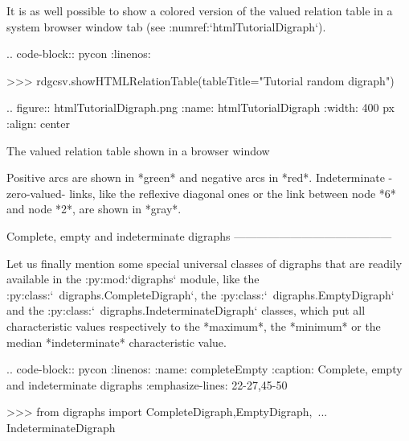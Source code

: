 {It is as well possible to show a colored version of the valued relation table in a system browser window tab (see :numref:`htmlTutorialDigraph`).

.. code-block:: pycon
   :linenos:

   >>> rdgcsv.showHTMLRelationTable(tableTitle="Tutorial random digraph")

.. figure:: htmlTutorialDigraph.png
   :name: htmlTutorialDigraph
   :width: 400 px
   :align: center

   The valued relation table shown in a browser window 

Positive arcs are shown in *green* and negative arcs in *red*. Indeterminate -zero-valued- links, like the reflexive diagonal ones or the link between node *6* and node *2*, are shown in *gray*.

Complete, empty and indeterminate digraphs
------------------------------------------

Let us finally mention some special universal classes of digraphs that are readily available in the :py:mod:`digraphs` module, like the :py:class:`~digraphs.CompleteDigraph`, the :py:class:`~digraphs.EmptyDigraph` and the :py:class:`~digraphs.IndeterminateDigraph` classes, which put all characteristic values respectively to the *maximum*, the *minimum* or the median *indeterminate* characteristic value.

.. code-block:: pycon
   :linenos:
   :name: completeEmpty
   :caption: Complete, empty and indeterminate digraphs
   :emphasize-lines: 22-27,45-50

   >>> from digraphs import CompleteDigraph,EmptyDigraph,\
   ...   			 IndeterminateDigraph
   
}
